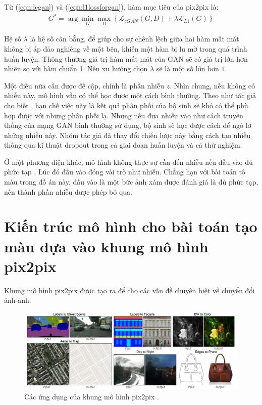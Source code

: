 \documentclass[a4paper, 12pt]{report}
\begin{document}
Từ (\ref{eqn:lcgan}) và (\ref{eqn:l1lossforgan}), hàm mục tiêu của pix2pix là:
\begin{align}
    G^* = \arg\min_G\max_D\left\{\mathcal{L}_{cGAN}\left(G, D\right) + \lambda\mathcal{L}_{L1}\left(G\right)\right\}\label{eqn:losspix2pix}
\end{align}

Hệ số $\lambda$ là hệ số cân bằng, để giúp cho sự chênh lệch giữa hai hàm mất mát không bị áp đảo nghiêng về một bên, khiến một hàm bị lu mờ trong quá trình huấn luyện.
Thông thường giá trị hàm mất mát của GAN sẽ có giá trị lớn hơn nhiều so với hàm chuẩn 1. Nên xu hướng chọn $\lambda$ sẽ là một số lớn hơn $1$.\vspace{5pt}

Một điều nữa cần được đề cập, chính là phần nhiễu $z$.
Nhìn chung, nếu không có nhiễu này, mô hình vẫn có thể học được một cách bình thường.
Theo như tác giả cho biết \cite{isola2018imagetoimage}, hạn chế việc này là kết quả phân phối của bộ sinh sẽ khó có thể phù hợp được với những phân phối lạ.
Nhưng nếu đưa nhiễu vào như cách truyền thống của mạng GAN bình thường sử dụng, bộ sinh sẽ học được cách để ngó lơ những nhiễu này.
Nhóm tác giả đã thay đổi chiến lược này bằng cách tạo nhiễu thông qua kĩ thuật dropout \cite{dropouthinton2014} trong cả giai đoạn huấn luyện và cả thử nghiệm.\vspace{5pt}

Ở một phương diện khác, mô hình không thực sự cần đến nhiễu nếu đầu vào đủ phức tạp \cite{replyrandomnoisez}.
Lúc đó đầu vào đóng vài trò như nhiễu.
Chẳng hạn với bài toán tô màu trong đồ án này, đầu vào là một bức ảnh xám được đánh giá là đủ phức tạp, nên thành phần nhiễu được phép bỏ qua.


\chapter{Kiến trúc mô hình cho bài toán tạo màu dựa vào khung mô hình pix2pix}\label{mainarchitecture}

Khung mô hình pix2pix được tạo ra để cho các vấn đề chuyên biệt về chuyển đổi ảnh-ảnh.

\begin{figure}[!h]
\captionsetup{width=0.8\textwidth}
\centering
\includegraphics[width=15cm]{images/appofpix2pix.jpg}
\caption{Các ứng dụng của khung mô hình pix2pix \cite{isola2018imagetoimage}.}
\label{fig:appofpix2pix}
\end{figure}
\end{document}
